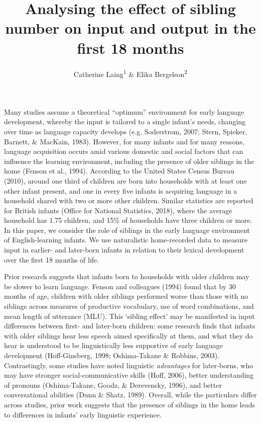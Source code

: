 \documentclass[
  man,floatsintext]{apa6}
\title{Analysing the effect of sibling number on input and output in the first 18 months}
\author{Catherine Laing\textsuperscript{1} \& Elika Bergelson\textsuperscript{2}}
\date{}
\affiliation{\vspace{0.5cm}\textsuperscript{1} University of York, York, UK\\\textsuperscript{2} Duke University, Durham, NC, USA}
\begin{document}
\maketitle

Many studies assume a theoretical ``optimum'' environment for early language development, whereby the input is tailored to a single infant's needs, changing over time as language capacity develops (e.g. Soderstrom, 2007; Stern, Spieker, Barnett, \& MacKain, 1983). However, for many infants and for many reasons, language acquisition occurs amid various domestic and social factors that can influence the learning environment, including the presence of older siblings in the home (Fenson et al., 1994). According to the United States Census Bureau (2010), around one third of children are born into households with at least one other infant present, and one in every five infants is acquiring language in a household shared with two or more other children. Similar statistics are reported for British infants (Office for National Statistics, 2018), where the average household has 1.75 children, and 15\% of households have three children or more. In this paper, we consider the role of siblings in the early language environment of English-learning infants. We use naturalistic home-recorded data to measure input in earlier- and later-born infants in relation to their lexical development over the first 18 months of life.

Prior research suggests that infants born to households with older children may be slower to learn language. Fenson and colleagues (1994) found that by 30 months of age, children with older siblings performed worse than those with no siblings across measures of productive vocabulary, use of word combinations, and mean length of utterance (MLU). This `sibling effect' may be manifested in input differences between first- and later-born children: some research finds that infants with older siblings hear less speech aimed specifically at them, and what they do hear is understood to be linguistically less supportive of early language development (Hoff-Ginsberg, 1998; Oshima-Takane \& Robbins, 2003). Contrastingly, some studies have noted linguistic \emph{advantages} for later-borns, who may have stronger social-communicative skills (Hoff, 2006), better understanding of pronouns (Oshima-Takane, Goodz, \& Derevensky, 1996), and better conversational abilities (Dunn \& Shatz, 1989). Overall, while the particulars differ across studies, prior work suggests that the presence of siblings in the home leads to differences in infants' early linguistic experience.
\end{document}
